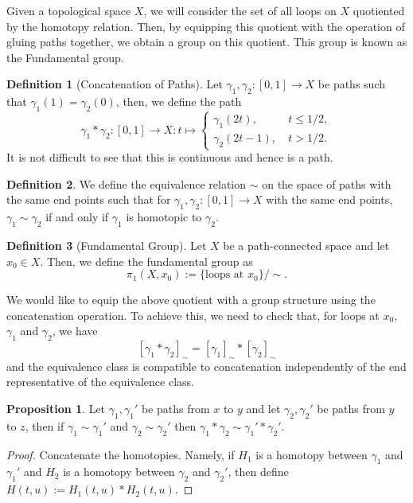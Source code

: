 \documentclass[]{article}
\theoremstyle{definition}
\theoremstyle{definition}
\newtheorem{definition}{Definition}[section]
\newtheorem{proposition}{Proposition}[section]
\begin{document}
Given a topological space \(X\), we will consider the set of all loops on 
\(X\) quotiented by the homotopy relation. Then, by equipping this quotient with 
the operation of gluing paths together, we obtain a group on this quotient. This 
group is known as the Fundamental group.

\begin{definition}[Concatenation of Paths]
  Let \(\gamma_1, \gamma_2 : [0, 1] \to X\) be paths such that \(\gamma_1(1) = \gamma_2(0)\), 
  then, we define the path 
  \[\gamma_1 * \gamma_2 : [0, 1] \to X : t \mapsto 
  \begin{cases}
    \gamma_1(2t), \ & t \le 1 / 2,\\
    \gamma_2(2t - 1), \ & t > 1 / 2. 
  \end{cases}\] 
  It is not difficult to see that this is continuous and hence is a path.
\end{definition}

\begin{definition}
  We define the equivalence relation \(\sim\) on the space of paths with the 
  same end points such that for \(\gamma_1, \gamma_2 : [0, 1] \to X\) with 
  the same end points, \(\gamma_1 \sim \gamma_2\) if and only if 
  \(\gamma_1\) is homotopic to \(\gamma_2\).
\end{definition}

\begin{definition}[Fundamental Group]
  Let \(X\) be a path-connected space and let \(x_0 \in X\). Then, we define 
  the fundamental group as 
  \[\pi_1(X, x_0) := \{\text{loops at \(x_0\)}\} / \sim.\]
\end{definition}

We would like to equip the above quotient with a group structure using the 
concatenation operation. To achieve this, we need to check that, for loops 
at \(x_0\), \(\gamma_1\) and \(\gamma_2\), we have 
\[[\gamma_1 * \gamma_2]_\sim = [\gamma_1]_\sim * [\gamma_2]_\sim\]
and the equivalence class is compatible to concatenation independently of the 
end representative of the equivalence class.

\begin{proposition}
  Let \(\gamma_1, \gamma_1'\) be paths from \(x\) to \(y\) and let \(\gamma_2, \gamma_2'\) 
  be paths from \(y\) to \(z\), then if \(\gamma_1 \sim \gamma_1'\) and 
  \(\gamma_2 \sim \gamma_2'\) then \(\gamma_1 * \gamma_2 \sim \gamma_1' * \gamma_2'\).
\end{proposition}
\begin{proof}
  Concatenate the homotopies. Namely, if \(H_1\) is a homotopy between \(\gamma_1\) 
  and \(\gamma_1'\) and \(H_2\) is a homotopy between \(\gamma_2\) and \(\gamma_2'\), 
  then define \(H(t, u) := H_1(t, u) * H_2(t, u)\). 
\end{proof}
\end{document}
